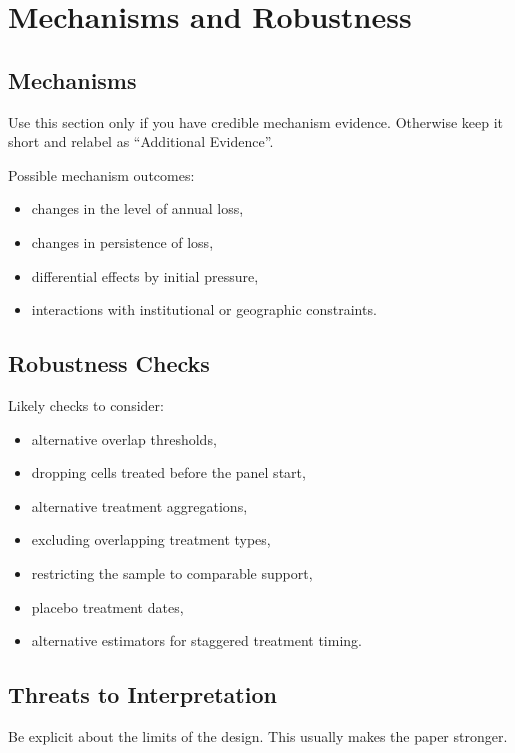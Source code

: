 \section{Mechanisms and Robustness}

\subsection{Mechanisms}

Use this section only if you have credible mechanism evidence. Otherwise keep it short and relabel as ``Additional Evidence''.

Possible mechanism outcomes:

\begin{itemize}
    \item changes in the level of annual loss,
    \item changes in persistence of loss,
    \item differential effects by initial pressure,
    \item interactions with institutional or geographic constraints.
\end{itemize}

\subsection{Robustness Checks}

Likely checks to consider:

\begin{itemize}
    \item alternative overlap thresholds,
    \item dropping cells treated before the panel start,
    \item alternative treatment aggregations,
    \item excluding overlapping treatment types,
    \item restricting the sample to comparable support,
    \item placebo treatment dates,
    \item alternative estimators for staggered treatment timing.
\end{itemize}

\subsection{Threats to Interpretation}

Be explicit about the limits of the design. This usually makes the paper stronger.
